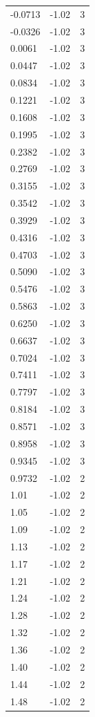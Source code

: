 \begin{longtable}{lrr}
  -0.0713 & -1.02 & 3 \\
  -0.0326 & -1.02 & 3 \\
  0.0061 & -1.02 & 3 \\
  0.0447 & -1.02 & 3 \\
  0.0834 & -1.02 & 3 \\
  0.1221 & -1.02 & 3 \\
  0.1608 & -1.02 & 3 \\
  0.1995 & -1.02 & 3 \\
  0.2382 & -1.02 & 3 \\
  0.2769 & -1.02 & 3 \\
  0.3155 & -1.02 & 3 \\
  0.3542 & -1.02 & 3 \\
  0.3929 & -1.02 & 3 \\
  0.4316 & -1.02 & 3 \\
  0.4703 & -1.02 & 3 \\
  0.5090 & -1.02 & 3 \\
  0.5476 & -1.02 & 3 \\
  0.5863 & -1.02 & 3 \\
  0.6250 & -1.02 & 3 \\
  0.6637 & -1.02 & 3 \\
  0.7024 & -1.02 & 3 \\
  0.7411 & -1.02 & 3 \\
  0.7797 & -1.02 & 3 \\
  0.8184 & -1.02 & 3 \\
  0.8571 & -1.02 & 3 \\
  0.8958 & -1.02 & 3 \\
  0.9345 & -1.02 & 3 \\
  0.9732 & -1.02 & 2 \\
  1.01 & -1.02 & 2 \\
  1.05 & -1.02 & 2 \\
  1.09 & -1.02 & 2 \\
  1.13 & -1.02 & 2 \\
  1.17 & -1.02 & 2 \\
  1.21 & -1.02 & 2 \\
  1.24 & -1.02 & 2 \\
  1.28 & -1.02 & 2 \\
  1.32 & -1.02 & 2 \\
  1.36 & -1.02 & 2 \\
  1.40 & -1.02 & 2 \\
  1.44 & -1.02 & 2 \\
  1.48 & -1.02 & 2 \\

\end{longtable}
